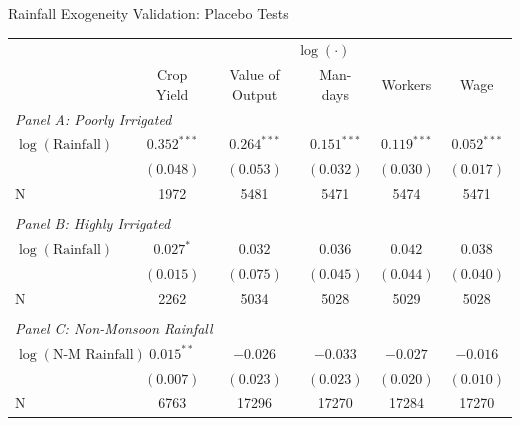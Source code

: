  \begin{frame}{Rainfall Exogeneity Validation: Placebo Tests}
    \begin{table}[h!]
        \footnotesize
        \begin{center}
            \label{tab:rainfall_placebo}
            \begin{tabular}{lccccc}
            
                & \multicolumn{5}{c}{$\log(\cdot)$} \\ \cline{2-6}
                & Crop Yield & Value of Output & Man-days & Workers & Wage \\ \hline
               \multicolumn{3}{l}{\textit{Panel A: Poorly Irrigated}} & \\
               $\log(\text{Rainfall})$ & $0.352^{***}$ &$0.264^{***}$ & $0.151^{***}$ & $0.119^{***}$  & $0.052^{***}$\\
                & $(0.048)$ & $(0.053)$& $(0.032)$& $(0.030)$& $(0.017)$ \\
                N & 1972 & 5481 & 5471 & 5474 & 5471\\
                &\\
                \multicolumn{3}{l}{\textit{ Panel B: Highly Irrigated}} & \\
               $\log(\text{Rainfall})$ & $0.027^{*}$ &$0.032$ & $0.036$ & $0.042$  & $0.038$\\
                & $(0.015)$ & $(0.075)$& $(0.045)$& $(0.044)$& $(0.040)$ \\
                N & 2262 & 5034 & 5028 & 5029 & 5028\\
                &\\
                \multicolumn{3}{l}{\textit{Panel C: Non-Monsoon Rainfall}} & \\
               $\log(\text{N-M Rainfall})$ & $0.015^{**}$ &$-0.026$ & $-0.033$ & $-0.027$  & $-0.016$\\
                & $(0.007)$ & $(0.023)$& $(0.023)$& $(0.020)$& $(0.010)$ \\
                N & 6763 & 17296 & 17270 & 17284 & 17270
            \end{tabular}
        \end{center}
    \end{table}
 \end{frame}


